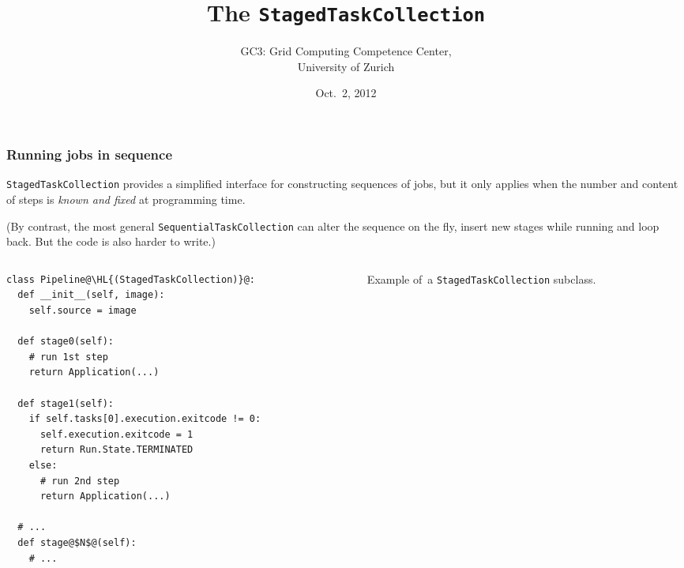 \documentclass[english,serif,mathserif,xcolor=pdftex,dvipsnames,table]{beamer}
\title{%
  The \texttt{StagedTaskCollection}
}
\author[Riccardo Murri]{%
  GC3: Grid Computing Competence Center, \\
  University of Zurich
}
\date{Oct.~2, 2012}
\begin{document}
\maketitle


\begin{frame}[fragile]
  \frametitle{Running jobs in sequence}

  \texttt{StagedTaskCollection} provides a simplified interface for
  constructing sequences of jobs, but it only applies when the number
  and content of steps is \emph{known and fixed} at programming time.

  \+
  (By contrast, the most general \texttt{SequentialTaskCollection}
  can alter the sequence on the fly, insert new stages while running
  and loop back. But the code is also harder to write.)
\end{frame}


\begin{frame}[fragile]
  \begin{columns}[t]
    \begin{column}{0.6\textwidth}
      \begin{lstlisting}
class Pipeline@\HL{(StagedTaskCollection)}@:
  def __init__(self, image):
    self.source = image

  def stage0(self):
    # run 1st step
    return Application(...)

  def stage1(self):
    if self.tasks[0].execution.exitcode != 0:
      self.execution.exitcode = 1
      return Run.State.TERMINATED
    else:
      # run 2nd step
      return Application(...)

  # ...
  def stage@$N$@(self):
    # ...
      \end{lstlisting}
    \end{column}
    \begin{column}{0.4\textwidth}
      \raggedleft

      \+\+
      Example of~a \texttt{StagedTaskCollection}
      subclass.
    \end{column}
  \end{columns}
\end{frame}
\end{document}
